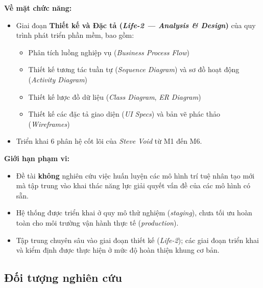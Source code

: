 \documentclass[13pt,a4paper,oneside]{extreport}
\numberwithin{equation}{chapter}
\numberwithin{figure}{chapter}
\numberwithin{table}{chapter}
\begin{document}
\textbf{Về mặt chức năng:}
\begin{itemize}
    \item Giai đoạn \textbf{Thiết kế và Đặc tả (\textit{Life-2 — Analysis \& Design})} của quy trình phát triển phần mềm, bao gồm:
    \begin{itemize}
        \item Phân tích luồng nghiệp vụ (\textit{Business Process Flow})
        \item Thiết kế tương tác tuần tự (\textit{Sequence Diagram}) và sơ đồ hoạt động (\textit{Activity Diagram})
        \item Thiết kế lược đồ dữ liệu (\textit{Class Diagram}, \textit{ER Diagram})
        \item Thiết kế các đặc tả giao diện (\textit{UI Specs}) và bản vẽ phác thảo (\textit{Wireframes})
    \end{itemize}
    \item Triển khai 6 phân hệ cốt lõi của \textit{Steve Void} từ M1 đến M6.
\end{itemize}

\textbf{Giới hạn phạm vi:}
\begin{itemize}
    \item Đề tài \textbf{không} nghiên cứu việc huấn luyện các mô hình trí tuệ nhân tạo mới mà tập trung vào khai thác năng lực giải quyết vấn đề của các mô hình có sẵn.
    \item Hệ thống được triển khai ở quy mô thử nghiệm (\textit{staging}), chưa tối ưu hoàn toàn cho môi trường vận hành thực tế (\textit{production}).
    \item Tập trung chuyên sâu vào giai đoạn thiết kế (\textit{Life-2}); các giai đoạn triển khai và kiểm định được thực hiện ở mức độ hoàn thiện khung cơ bản.
\end{itemize}

\subsection*{Đối tượng nghiên cứu}
\end{document}
